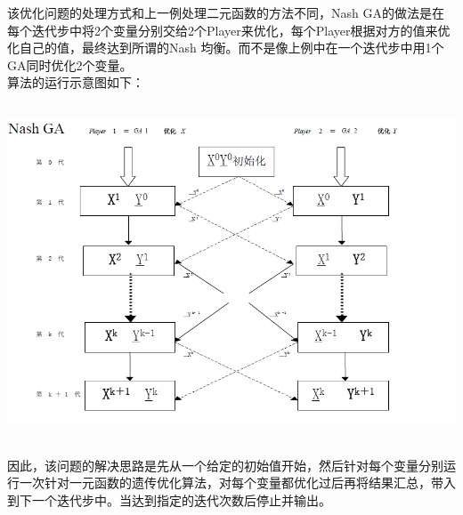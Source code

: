 \documentclass[UTF8]{ctexart}
\begin{document}
\indent 该优化问题的处理方式和上一例处理二元函数的方法不同，Nash GA的做法是在每个迭代步中将2个变量分别交给2个Player来优化，每个Player根据对方的值来优化自己的值，最终达到所谓的Nash 均衡。而不是像上例中在一个迭代步中用1个GA同时优化2个变量。\\
\indent 算法的运行示意图如下：
\begin{center}
\includegraphics[width=14cm,height=10cm]{../pic/T2_illus.png}
\end{center}
\indent 因此，该问题的解决思路是先从一个给定的初始值开始，然后针对每个变量分别运行一次针对一元函数的遗传优化算法，对每个变量都优化过后再将结果汇总，带入到下一个迭代步中。当达到指定的迭代次数后停止并输出。\\
\end{document}
